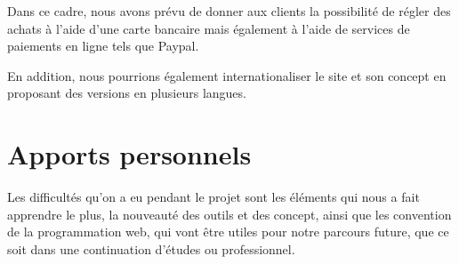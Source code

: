 \documentclass[a4paper,12pt]{report}
\theoremstyle{break}
\theoremstyle{break}
\theoremstyle{break}
\theoremstyle{break}
\theoremstyle{definition}
\theoremstyle{remark}
\begin{document}
Dans ce cadre, nous avons prévu de donner aux clients la possibilité de régler des achats à l'aide d'une carte bancaire mais également à l'aide de services de paiements en ligne tels que Paypal.

En addition, nous pourrions également internationaliser le site et son concept en proposant des versions en plusieurs langues.
\section{Apports personnels}
Les difficultés qu'on a eu pendant le projet sont les éléments qui nous a fait apprendre le plus,
la nouveauté des outils et des concept, ainsi que les convention de la programmation web, qui vont être utiles pour
notre parcours future, que ce soit dans une continuation d'études ou professionnel.

\begin{appendices}
\end{appendices}


\end{document}
